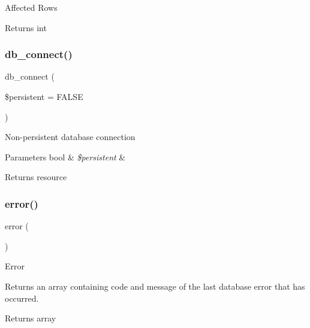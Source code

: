Affected Rows

\begin{DoxyReturn}{Returns}
int 
\end{DoxyReturn}
\mbox{\label{class_c_i___d_b__oci8__driver_a52bf595e79e96cc0a7c907a9b45aeb4d}} 
\subsubsection{\texorpdfstring{db\+\_\+connect()}{db\_connect()}}
{\footnotesize\ttfamily db\+\_\+connect (\begin{DoxyParamCaption}\item[{}]{\$persistent = {\ttfamily FALSE} }\end{DoxyParamCaption})}

Non-\/persistent database connection


\begin{DoxyParams}[1]{Parameters}
bool & {\em \$persistent} & \\
\hline
\end{DoxyParams}
\begin{DoxyReturn}{Returns}
resource 
\end{DoxyReturn}
\mbox{\label{class_c_i___d_b__oci8__driver_a43b8d30b879d4f09ceb059b02af2bc02}} 
\subsubsection{\texorpdfstring{error()}{error()}}
{\footnotesize\ttfamily error (\begin{DoxyParamCaption}{ }\end{DoxyParamCaption})}

Error

Returns an array containing code and message of the last database error that has occurred.

\begin{DoxyReturn}{Returns}
array 
\end{DoxyReturn}
\mbox{\label{class_c_i___d_b__oci8__driver_a90355121e1ed009e0efdbd544ab56efa}} 
